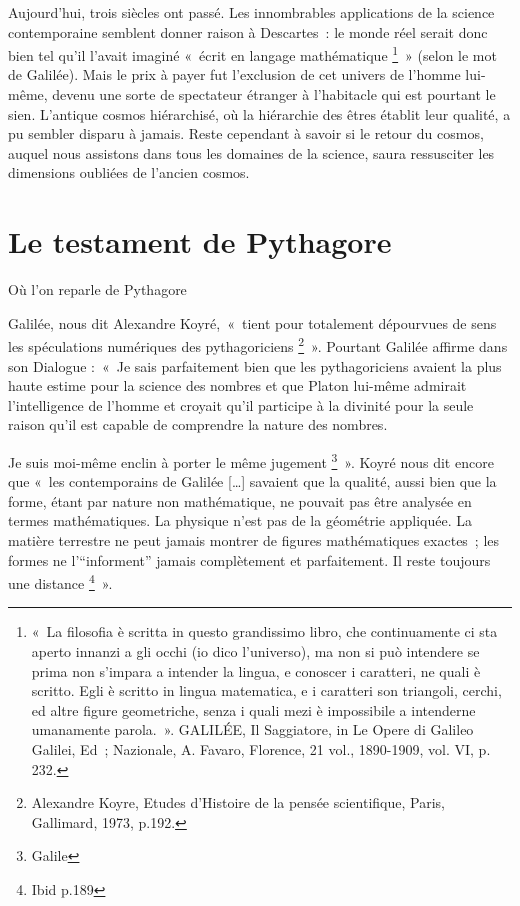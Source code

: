 \documentclass[a4paper,12pt]{article}
\begin{document}
Aujourd'hui, trois siècles ont passé. Les innombrables applications de la science contemporaine semblent donner raison à Descartes : le monde réel serait donc bien tel qu'il l'avait imaginé « écrit en langage mathématique \footnote{« La filosofia è scritta in questo grandissimo libro, che continuamente ci sta aperto innanzi a gli occhi (io dico l’universo), ma non si può intendere se prima non s’impara a intender la lingua, e conoscer i caratteri, ne quali è scritto. Egli è scritto in lingua matematica, e i caratteri son triangoli, cerchi, ed altre figure geometriche, senza i quali mezi è impossibile a intenderne umanamente parola. ». GALILÉE, Il Saggiatore, in Le Opere di Galileo Galilei, Ed ; Nazionale, A. Favaro, Florence, 21 vol., 1890-1909, vol. VI, p. 232.} » (selon le mot de Galilée). Mais le prix à payer fut l'exclusion de cet univers de l'homme lui-même, devenu une sorte de spectateur étranger à l'habitacle qui est pourtant le sien. L'antique cosmos hiérarchisé, où la hiérarchie des êtres établit leur qualité, a pu sembler disparu à jamais. Reste cependant à savoir si le retour du cosmos, auquel nous assistons dans tous les domaines de la science, saura ressusciter les dimensions oubliées de l'ancien cosmos.

\section{Le testament de Pythagore}

Où l’on reparle de Pythagore

Galilée, nous dit Alexandre Koyré, « tient pour totalement dépourvues de sens les spéculations numériques des pythagoriciens \footnote{Alexandre Koyre, Etudes d’Histoire de la pensée scientifique, Paris, Gallimard, 1973, p.192.} ». Pourtant Galilée affirme dans son Dialogue : « Je sais parfaitement bien que les pythagoriciens avaient la plus haute estime pour la science des nombres et que Platon lui-même admirait l'intelligence de l'homme et croyait qu'il participe à la divinité pour la seule raison qu'il est capable de comprendre la nature des nombres. 

Je suis moi-même enclin à porter le même jugement \footnote{Galile} ». Koyré nous dit encore que « les contemporains de Galilée […] savaient que la qualité, aussi bien que la forme, étant par nature non mathématique, ne pouvait pas être analysée en termes mathématiques. La physique n'est pas de la géométrie appliquée. La matière terrestre ne peut jamais montrer de figures mathématiques exactes ; les formes ne l'“informent” jamais complètement et parfaitement. Il reste toujours une distance \footnote{Ibid p.189} ».
\end{document}
